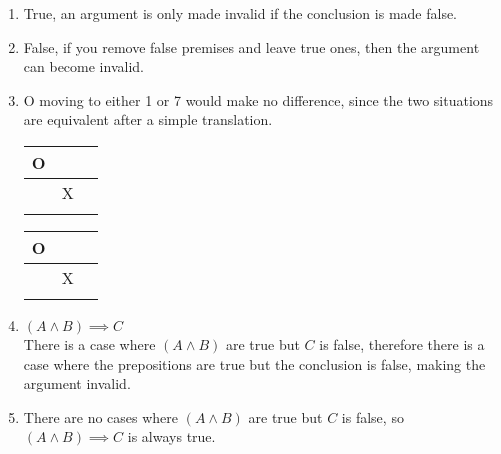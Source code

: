 \documentclass{article}
\begin{document}
\begin{enumerate}
	\item
		True, an argument is only made invalid if the conclusion is made false.
	\item
		False, if you remove false premises and leave true ones, then the argument can become invalid.
	\item
		O moving to either 1 or 7 would make no difference, since the two situations are equivalent after a simple translation.
		\begin{tabular}{c|c|c}
			O &   &   & \\ \hline
			  & X &   & \\ \hline
			  &   &   & \\
		\end{tabular}
		\begin{tabular}{c|c|c}
			O &   &   & \\ \hline
			  & X &   & \\ \hline
			  &   &   & \\
		\end{tabular}

	\item
		$(A \land B) \implies C$ \\
		There is a case where $(A \land B)$ are true but $C$ is false, therefore there is a case where the prepositions are true but the conclusion is false, making the argument invalid.\\
	\item
		There are no cases where $(A \land B)$ are true but $C$ is false, so $(A \land B) \implies C$ is always true.
		
\end{enumerate}
\end{document}
